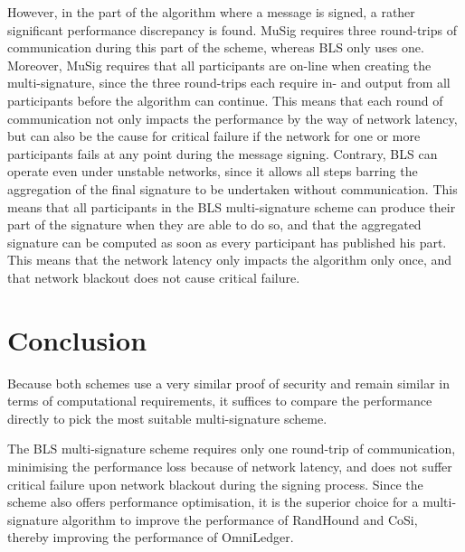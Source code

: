 However, in the part of the algorithm where a message is signed, a rather significant performance discrepancy is found. MuSig requires three round-trips of communication during this part of the scheme, whereas BLS only uses one. Moreover, MuSig requires that all participants are on-line when creating the multi-signature, since the three round-trips each require in- and output from all participants before the algorithm can continue. This means that each round of communication not only impacts the performance by the way of network latency, but can also be the cause for critical failure if the network for one or more participants fails at any point during the message signing. Contrary, BLS can operate even under unstable networks, since it allows all steps barring the aggregation of the final signature to be undertaken without communication. This means that all participants in the BLS multi-signature scheme can produce their part of the signature when they are able to do so, and that the aggregated signature can be computed as soon as every participant has published his part. This means that the network latency only impacts the algorithm only once, and that network blackout does not cause critical failure.

\section{Conclusion}
Because both schemes use a very similar proof of security and remain similar in terms of computational requirements, it suffices to compare the performance directly to pick the most suitable multi-signature scheme.

The BLS multi-signature scheme requires only one round-trip of communication, minimising the performance loss because of network latency, and does not suffer critical failure upon network blackout during the signing process. Since the scheme also offers performance optimisation, it is the superior choice for a multi-signature algorithm to improve the performance of RandHound and CoSi, thereby improving the performance of OmniLedger.